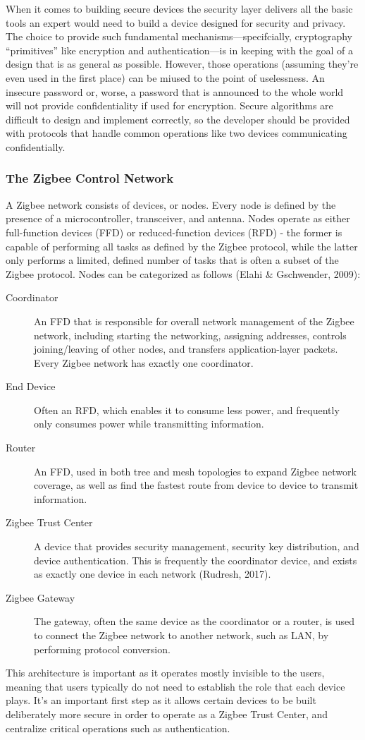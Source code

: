 When it comes to building secure devices the security layer delivers all the basic tools an expert would need to build a device designed for security and privacy.
The choice to provide such fundamental mechanisms---specifcially, cryptography ``primitives'' like encryption and authentication---is in keeping with the goal of a design that is as general as possible.
However, those operations (assuming they're even used in the first place) can be miused to the point of uselessness.
An insecure password or, worse, a password that is announced to the whole world will not provide confidentiality if used for encryption.
Secure algorithms are difficult to design and implement correctly, so the developer should be provided with protocols that handle common operations like two devices communicating confidentially.

\subsubsection{The Zigbee Control Network}

A Zigbee network consists of devices, or nodes. Every node is defined by the presence of a microcontroller, transceiver, and antenna. Nodes operate as either full-function devices (FFD) or reduced-function devices (RFD) - the former is capable of performing all tasks as defined by the Zigbee protocol, while the latter only performs a limited, defined number of tasks that is often a subset of the Zigbee protocol. Nodes can be categorized as follows (Elahi \& Gschwender, 2009):

\begin{description}
\item[Coordinator] An FFD that is responsible for overall network management of the Zigbee network, including starting the networking, assigning addresses, controls joining/leaving of other nodes, and transfers application-layer packets. Every Zigbee network has exactly one coordinator.
\item[End Device] Often an RFD, which enables it to consume less power, and frequently only consumes power while transmitting information.
\item[Router] An FFD, used in both tree and mesh topologies to expand Zigbee network coverage, as well as find the fastest route from device to device to transmit information.
\item[Zigbee Trust Center] A device that provides security management, security key distribution, and device authentication. This is frequently the coordinator device, and exists as exactly one device in each network (Rudresh, 2017). 
\item[Zigbee Gateway] The gateway, often the same device as the coordinator or a router, is used to connect the Zigbee network to another network, such as LAN, by performing protocol conversion.
\end{description} 

This architecture is important as it operates mostly invisible to the users, meaning that users typically do not need to establish the role that each device plays. It’s an important first step as it allows certain devices to be built deliberately more secure in order to operate as a Zigbee Trust Center, and centralize critical operations such as authentication.
